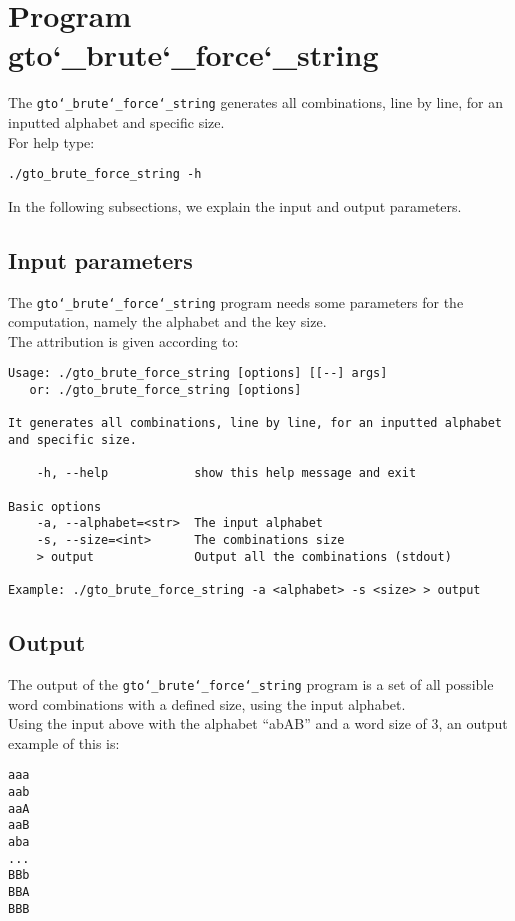 \section{Program gto\char`_brute\char`_force\char`_string}
The \texttt{gto\char`_brute\char`_force\char`_string} generates all combinations, line by line, for an inputted alphabet and specific size.\\
For help type:
\begin{lstlisting}
./gto_brute_force_string -h
\end{lstlisting}
In the following subsections, we explain the input and output parameters.

\subsection*{Input parameters}

The \texttt{gto\char`_brute\char`_force\char`_string} program needs some parameters for the computation, namely the alphabet and the key size.\\
The attribution is given according to:
\begin{lstlisting}
Usage: ./gto_brute_force_string [options] [[--] args]
   or: ./gto_brute_force_string [options]

It generates all combinations, line by line, for an inputted alphabet and specific size.

    -h, --help            show this help message and exit

Basic options
    -a, --alphabet=<str>  The input alphabet
    -s, --size=<int>      The combinations size
    > output              Output all the combinations (stdout)

Example: ./gto_brute_force_string -a <alphabet> -s <size> > output
\end{lstlisting}

\subsection*{Output}
The output of the \texttt{gto\char`_brute\char`_force\char`_string} program is a set of all possible word combinations with a defined size, using the input alphabet.\\
Using the input above with the alphabet ``abAB'' and a word size of 3, an output example of this is:
\begin{lstlisting}
aaa
aab
aaA
aaB
aba
...
BBb
BBA
BBB
\end{lstlisting}
